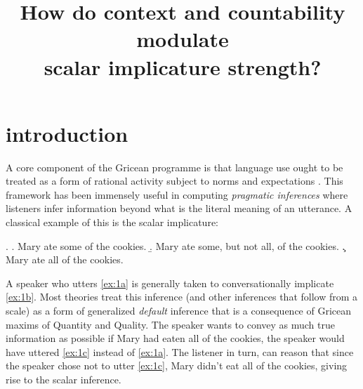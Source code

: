 \documentclass[10pt, biblatex, linguex]{report}
\title[phl\oldstylenums{394}k term paper]{How do context and countability modulate\\
                                    scalar implicature strength?}
\author[venkat]{
                \spauthor{
                    Venkata S Govindarajan \\
                    \institute{University of Texas at Austin} \\
                    \course{phl\oldstylenums{394}k term paper}
                    }
                }
\begin{document}
\maketitle


%


\section{introduction}
\label{sec:introduction}

A core component of the Gricean programme is that language use ought to be
treated as a form of rational activity subject to norms and expectations
\citep{grice_logic_1975}. This
framework has been immensely useful in computing \textit{pragmatic inferences}
where listeners infer information beyond what is the literal meaning
of an utterance. A classical example of this is the scalar implicature:

\ex. \label{ex:1}\a. Mary ate some of the cookies.\label{ex:1a}
                 \b. Mary ate some, but not all, of the cookies.\label{ex:1b}
                 \c. Mary ate all of the cookies.\label{ex:1c}

A speaker who utters \ref{ex:1a} is generally taken to conversationally
implicate \ref{ex:1b}. Most theories treat this inference (and other inferences
that follow from a scale) as a form of generalized \textit{default} inference
that is a consequence of Gricean maxims of Quantity and Quality\citep{grice_logic_1975,
horn_towards_1984}. The speaker
wants to convey as much true information as possible \dash if Mary had eaten all
of the cookies, the speaker would have uttered \ref{ex:1c} instead of
\ref{ex:1a}. The listener in turn, can
reason that since the speaker chose not to utter \ref{ex:1c}, Mary didn't eat
all of the cookies, giving rise to the scalar inference.
\end{document}

